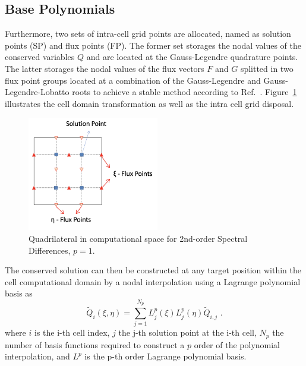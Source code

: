 \subsection{Base Polynomials}

Furthermore, two sets of intra-cell grid points are allocated, named as solution points (SP) and flux points (FP). 
The former set storages the nodal values of the conserved variables $Q$ and are located at the Gauss-Legendre quadrature points. 
The latter storages the nodal values of the flux vectors $F$ and $G$ splitted in two flux point groups 
located at a combination of the Gauss-Legendre and Gauss-Legendre-Lobatto roots to achieve a stable method according to Ref.\ \cite{KrisVanDenAbeele2009, Sun2007}. Figure\ \ref{fig:sp_fp_quad} illustrates the cell 
domain transformation as well as the intra cell grid disposal.
%
\begin{figure}[htb!]
	\centering
		\includegraphics[height=5.0cm]{figs/sd/sp_fp_quad.png}

\caption{Quadrilateral in computational space for 2nd-order Spectral Differences, $p=1$.}
\label{fig:sp_fp_quad}
\end{figure}

The conserved solution can then be constructed at any target position within the cell computational domain by 
a nodal interpolation using a Lagrange polynomial basis as
%
\begin{equation}
    \label{eq_sp_lagr}
    {\tilde{Q}_i}(\xi, \eta) = \sum_{j=1}^{N_p}{L^{p}_j(\xi) L^{p}_j(\eta) \tilde{Q}_{i,j}}
    \mbox{ .}
\end{equation}
%
where $i$ is the i-th cell index, $j$ the j-th solution point at the i-th cell, $N_p$ the number of basis functions
required to construct a $p$ order of the polynomial interpolation, and $L^{p}$ is the p-th order Lagrange polynomial basis.

